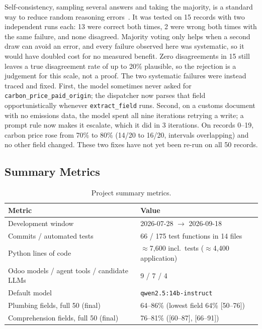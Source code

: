 Self-consistency, sampling several answers and taking the majority, is a
standard way to reduce random reasoning errors~\cite{wang2023selfconsistency}.
It was tested on 15 records with two independent runs each: 13 were
correct both times, 2 were wrong both times with the same failure, and
none disagreed. Majority voting only helps when a second draw can avoid an
error, and every failure observed here was systematic, so it would have
doubled cost for no measured benefit. Zero disagreements in 15 still
leaves a true disagreement rate of up to 20\% plausible, so the
rejection is a judgement for this scale, not a proof. The two systematic
failures were instead traced and fixed. First, the model sometimes never
asked for \texttt{carbon\_price\_paid\_origin}; the dispatcher now parses
that field opportunistically whenever \texttt{extract\_field} runs. Second,
on a customs document with no emissions data, the model spent all nine
iterations retrying a write; a prompt rule now makes it escalate, which it
did in 3 iterations. On records 0--19, carbon price rose from 70\% to 80\%
(14/20 to 16/20, intervals overlapping) and no other field changed. These
two fixes have not yet been re-run on all 50 records.

\subsection*{Summary Metrics}

\begin{table}[H]
\centering
{}
\small
\renewcommand{\arraystretch}{1.1}
\begin{tabularx}{\textwidth}{|L{6.4cm}|X|}
\hline
\textbf{Metric} & \textbf{Value} \\
\hline
Development window & 2026-07-28 $\rightarrow$ 2026-09-18 \\
\hline
Commits / automated tests & 66 / 175 test functions in 14 files \\
\hline
Python lines of code & $\approx$7{,}600 incl.\ tests ($\approx$4{,}400 application) \\
\hline
Odoo models / agent tools / candidate LLMs & 9 / 7 / 4 \\
\hline
Default model & \texttt{qwen2.5:14b-instruct} \\
\hline
Plumbing fields, full 50 (final) & 64--86\% (lowest field 64\% [50--76]) \\
\hline
Comprehension fields, full 50 (final) & 76--81\% ([60--87], [66--91]) \\
\hline
\end{tabularx}
\caption{Project summary metrics.}
\label{tab:summary_metrics}
\end{table}
\FloatBarrier

